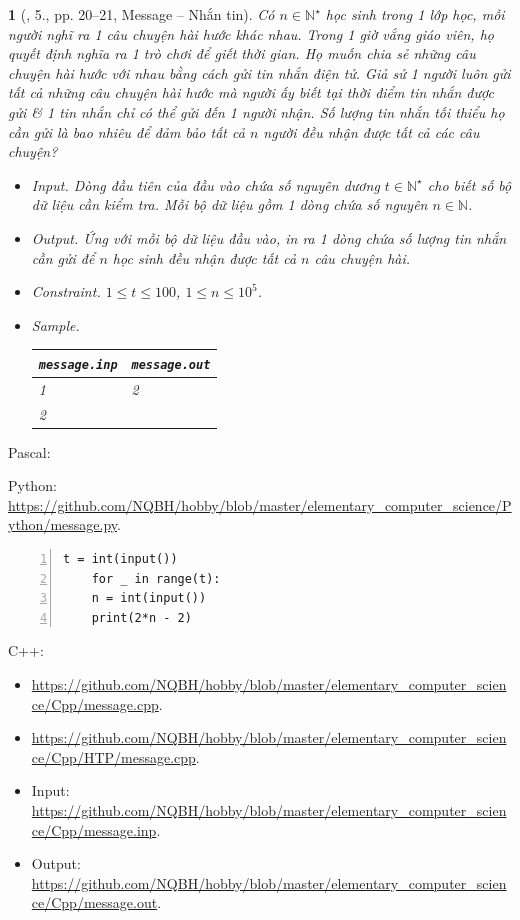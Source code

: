 \documentclass{article}
\newtheorem{baitoan}{}
\begin{document}
\begin{baitoan}[\cite{Duc_200_BT_Python}, 5., pp. 20--21, Message -- Nhắn tin]
	Có $n\in\mathbb{N}^\star$ học sinh trong 1 lớp học, mỗi người nghĩ ra 1 câu chuyện hài hước khác nhau. Trong 1 giờ vắng giáo viên, họ quyết định nghĩa ra 1 trò chơi để giết thời gian. Họ muốn chia sẻ những câu chuyện hài hước với nhau bằng cách gửi tin nhắn điện tử. Giả sử 1 người luôn gửi tất cả những câu chuyện hài hước mà người ấy biết tại thời điểm tin nhắn được gửi \& 1 tin nhắn chỉ có thể gửi đến 1 người nhận. Số lượng tin nhắn tối thiểu họ cần gửi là bao nhiêu để đảm bảo tất cả $n$ người đều nhận được tất cả các câu chuyện?
	\begin{itemize}
		\item {\sf Input.} Dòng đầu tiên của đầu vào chứa số nguyên dương $t\in\mathbb{N}^\star$ cho biết số bộ dữ liệu cần kiểm tra. Mỗi bộ dữ liệu gồm 1 dòng chứa số nguyên $n\in\mathbb{N}$.
		\item {\sf Output.} Ứng với mỗi bộ dữ liệu đầu vào, in ra 1 dòng chứa số lượng tin nhắn cần gửi để $n$ học sinh đều nhận được tất cả $n$ câu chuyện hài.
		\item {\sf Constraint.} $1\le t\le100$, $1\le n\le10^5$.
		\item {\sf Sample.}
		\begin{table}[H]
			\centering
			\begin{tabular}{|l|l|}
				\hline
				{\tt message.inp} & {\tt message.out} \\
				\hline
				1 & 2 \\
				2 & \\
				\hline
			\end{tabular}
		\end{table}
	\end{itemize}
\end{baitoan}
\noindent Pascal:

Python: \url{https://github.com/NQBH/hobby/blob/master/elementary_computer_science/Python/message.py}.
\begin{Verbatim}[numbers=left,xleftmargin=5mm]
	t = int(input())
	for _ in range(t):
	n = int(input())
	print(2*n - 2)
\end{Verbatim}
C++:
\begin{itemize}
	\item \url{https://github.com/NQBH/hobby/blob/master/elementary_computer_science/Cpp/message.cpp}.
	\item \url{https://github.com/NQBH/hobby/blob/master/elementary_computer_science/Cpp/HTP/message.cpp}.
	\item Input: \url{https://github.com/NQBH/hobby/blob/master/elementary_computer_science/Cpp/message.inp}.
	\item Output: \url{https://github.com/NQBH/hobby/blob/master/elementary_computer_science/Cpp/message.out}.
\end{itemize}
\end{document}
